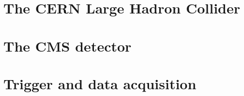 \section{The CERN Large Hadron Collider}

\section{The CMS detector}

\section{Trigger and data acquisition}
\label{sec:trigger}
